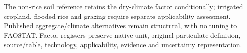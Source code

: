 The non-rice soil reference retains the dry-climate factor conditionally; irrigated cropland, flooded rice and grazing require separate applicability assessment. Published aggregate/climate alternatives remain structural, with no tuning to FAOSTAT. Factor registers preserve native unit, original particulate definition, source/table, technology, applicability, evidence and uncertainty representation.
